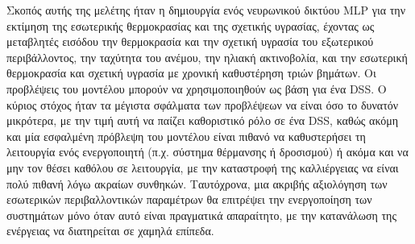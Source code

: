 \documentclass[12pt, a4paper]{report} %
\newcommand{\english}{\foreignlanguage{english}}
\begin{document}
Σκοπός αυτής της μελέτης ήταν η δημιουργία ενός νευρωνικού δικτύου \english{MLP} για την 
εκτίμηση της εσωτερικής θερμοκρασίας και της σχετικής υγρασίας, έχοντας ως μεταβλητές εισόδου την θερμοκρασία και την 
σχετική υγρασία του εξωτερικού περιβάλλοντος, την ταχύτητα του ανέμου, την ηλιακή ακτινοβολία, και την εσωτερική 
θερμοκρασία και σχετική υγρασία με χρονική καθυστέρηση τριών βημάτων. Οι προβλέψεις του μοντέλου μπορούν να 
χρησιμοποιηθούν ως βάση για ένα \english{DSS}. Ο κύριος στόχος ήταν τα μέγιστα σφάλματα των προβλέψεων να είναι όσο το 
δυνατόν μικρότερα, με την τιμή αυτή να παίζει καθοριστικό ρόλο σε ένα \english{DSS}, καθώς ακόμη και μία εσφαλμένη πρόβλεψη 
του μοντέλου είναι πιθανό να καθυστερήσει τη λειτουργία ενός ενεργοποιητή (π.χ. σύστημα θέρμανσης ή δροσισμού) ή ακόμα και 
να μην τον θέσει καθόλου σε λειτουργία, με την καταστροφή της καλλιέργειας να είναι πολύ πιθανή λόγω ακραίων 
συνθηκών. Ταυτόχρονα, μια ακριβής αξιολόγηση των εσωτερικών περιβαλλοντικών παραμέτρων θα επιτρέψει την ενεργοποίηση 
των συστημάτων μόνο όταν αυτό είναι πραγματικά απαραίτητο, με την κατανάλωση της ενέργειας να διατηρείται σε χαμηλά 
επίπεδα.
\end{document}
